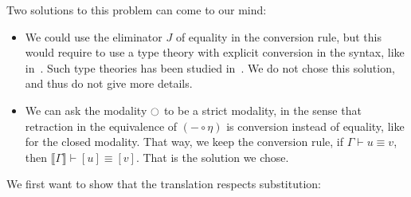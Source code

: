 Two solutions to this problem can come to our mind:
\begin{itemize}
\item We could use the eliminator $J$ of equality in the conversion
  rule, but this would require to use a type theory with explicit
  conversion in the syntax, like in~\cite{jaber2012extending}. Such
  type theories has been studied
  in~\cite{geuvers2004,van2013explicit}. We do not chose this
  solution, and thus do not give more details.
\item We can ask the modality $\ocircle$ to be a strict modality, in the
  sense that retraction in the equivalence of $(-\circ\eta)$ is conversion
  instead of equality, like for the closed modality. 
  That way, we keep the conversion rule, \ie{} if $\Gamma \vdash
  u \equiv v$, then $\Lbrack \Gamma \Rbrack \vdash [u] \equiv [v]$.
  That is the solution we chose.
\end{itemize}


We first want to show that the translation respects substitution:


